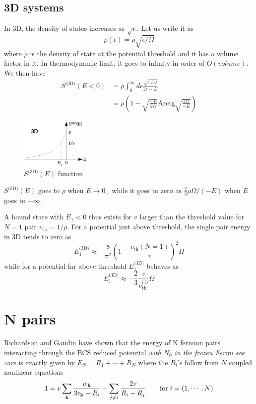 \documentclass{article}
\newcommand{\sd}{{\ensuremath{{\text{(3D)}}}}}
\newcommand{\Arctg}{\ensuremath{\text{Arctg}}}
\begin{document}
\subsection{3D systems}
In 3D, the density of states increases as $\sqrt{\epsilon}$. Let us write it as 
\begin{equation}
\rho(\epsilon)=\rho\sqrt{\epsilon/\Omega}
\label{eq:}
\end{equation}
where $\rho$ is the density of state at the potential threshold and it has a volume factor in it. In thermodynamic limit, it goes to infinity in order of $O(volume)$.  We then have
\begin{equation}
\begin{split}
S^\sd(E<0)&=\rho\int_0^\infty{}d\epsilon\frac{\sqrt{\epsilon/\Omega}}{2\epsilon-E}\\
	&=\rho(1-\sqrt{\frac{-E}{2\Omega}}\Arctg\sqrt{\frac{2\Omega}{-E}})
\label{eq:}
\end{split}
\end{equation}
\begin{figure}[htbp]
	\centering
		\includegraphics[width=0.30\textwidth]{3dOnePair.eps}
	\caption{$S^\sd(E)$ function}
	\label{fig:3dOnePair}
\end{figure}

$S^\sd(E)$ goes to $\rho$ when $E\rightarrow0_-$ while it goes to zero as $\frac{2}{3}\rho\Omega/(-E)$ when $E$ goes to $-\infty$. 

A bound state with $E_1<0$ thus exists for $v$ larger than the threshold value for $N=1$ pair $v_{\text{th}}=1/\rho$.  For a potential just above threshold, the single pair energy in 3D tends to zero as 
\begin{equation}
E_1^\sd\approx-\frac{8}{\pi^2}\left(1-\frac{v_{\text{th}}(N=1)}{v}\right)^2\Omega
\label{eq:}
\end{equation}
while for a potential far above threshold $E_1^\sd$ behaves as 
\begin{equation}
E_1^\sd\approx-\frac{2}{3}\frac{v}{v_\text{th}^{\text{(1)}}}\Omega
\label{eq:}
\end{equation}


\section{N pairs\label{sec:NPair}}
Richardson \cite{Richardson1} and Gaudin \cite{gaudin} have shown that the energy of N fermion pairs interacting through the BCS reduced potential \emph{with $N_0$ in the frozen Fermi sea core} is exactly given by $E_N=R_1+\cdots+R_N$ where the $R_i$'s follow from $N$ coupled nonlinear equations 
\begin{equation}
 1=v\sum_{\mathbf{k}}\frac{w_{\mathbf{k}}}{2\epsilon_{\mathbf{k}}-R_i}+\sum_{j\neq{}i}\frac{2v}{R_i-R_j}\qquad\text{for}\;i=(1,\cdots,N)
\end{equation}
\end{document}
